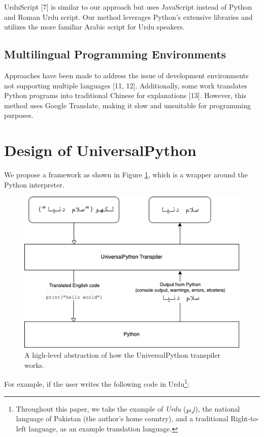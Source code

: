 \documentclass[conference]{IEEEtran}
\begin{document}
UrduScript [7] is similar to our approach but uses JavaScript instead of Python and Roman Urdu script. Our method leverages Python's extensive libraries and utilizes the more familiar Arabic script for Urdu speakers.

\subsection{Multilingual Programming Environments}

Approaches have been made to address the issue of development environments not supporting multiple languages [11, 12]. Additionally, some work translates Python programs into traditional Chinese for explanations [13]. However, this method uses Google Translate, making it slow and unsuitable for programming purposes.

\section{Design of UniversalPython}

We propose a framework as shown in Figure \ref{flowchart}, which is a wrapper around the Python interpreter.

\begin{figure}[htbp]
\centerline{\includegraphics[width=\columnwidth]{UniversalPython-flowchart.png}}
\caption{A high-level abstraction of how the UniversalPython transpiler works.}
\label{flowchart}
\end{figure}

For example, if the user writes the following code in Urdu\footnote{Throughout this paper, we take the example of \textit{Urdu} (\texturdu{اردو}), the national language of Pakistan (the author's home country), and a traditional Right-to-left language, as an example translation language. }:
\end{document}
